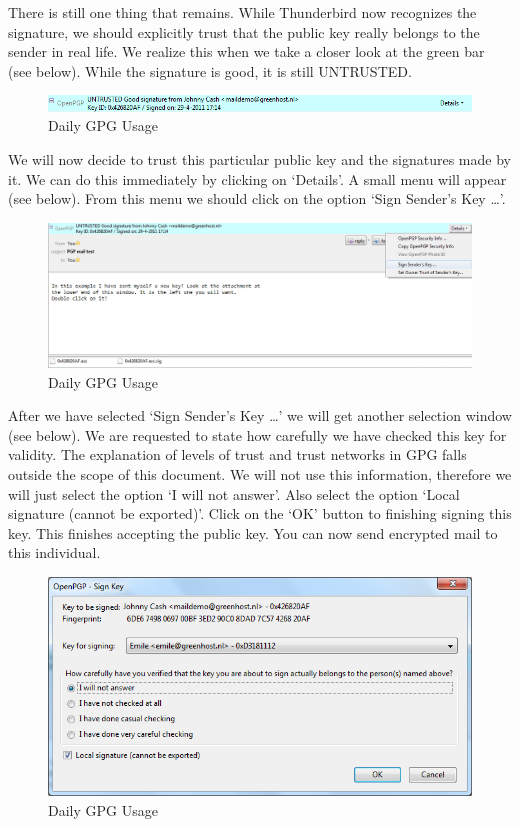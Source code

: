 There is still one thing that remains. While Thunderbird now recognizes
the signature, we should explicitly trust that the public key really
belongs to the sender in real life. We realize this when we take a
closer look at the green bar (see below). While the signature is good,
it is still UNTRUSTED.

\begin{figure}[htbp]
\centering
\includegraphics{daily_gpg_8.png}
\caption{Daily GPG Usage}
\end{figure}

We will now decide to trust this particular public key and the
signatures made by it. We can do this immediately by clicking on
`Details'. A small menu will appear (see below). From this menu we
should click on the option `Sign Sender's Key \ldots{}'.

\begin{figure}[htbp]
\centering
\includegraphics{daily_gpg_9.png}
\caption{Daily GPG Usage}
\end{figure}

After we have selected `Sign Sender's Key \ldots{}' we will get another
selection window (see below). We are requested to state how carefully we
have checked this key for validity. The explanation of levels of trust
and trust networks in GPG falls outside the scope of this document. We
will not use this information, therefore we will just select the option
`I will not answer'. Also select the option `Local signature (cannot be
exported)'. Click on the `OK' button to finishing signing this key. This
finishes accepting the public key. You can now send encrypted mail to
this individual.

\begin{figure}[htbp]
\centering
\includegraphics{daily_gpg_10.png}
\caption{Daily GPG Usage}
\end{figure}

